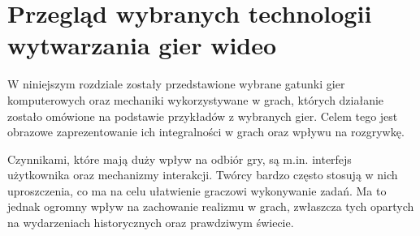\chapter{Przegląd wybranych technologii wytwarzania gier wideo}

W niniejszym rozdziale zostały przedstawione wybrane gatunki gier komputerowych oraz mechaniki wykorzystywane w grach,
których działanie zostało omówione na podstawie przykładów z wybranych gier. Celem tego jest obrazowe zaprezentowanie
ich integralności w grach oraz wpływu na rozgrywkę.

Czynnikami, które mają duży wpływ na odbiór gry, są m.in. interfejs użytkownika oraz mechanizmy interakcji. Twórcy bardzo
często stosują w nich uproszczenia, co ma na celu
ułatwienie graczowi wykonywanie zadań. Ma to jednak ogromny wpływ na zachowanie realizmu w grach, zwłaszcza tych opartych
na wydarzeniach historycznych oraz prawdziwym świecie.













